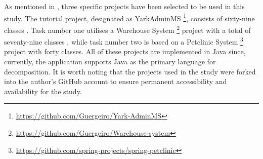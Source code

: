 As mentioned in , three specific projects have been
selected to be used in this study. The tutorial project, designated as
YarkAdminMS \footnote{\url{https://github.com/Guergeiro/Yark-AdminMS}},
consists of sixty-nine classes \cite{brito2021identification}. Task number one
utilises a Warehouse System
\footnote{\url{https://github.com/Guergeiro/Warehouse-system}} project with a
total of seventy-nine classes \cite{brito2021identification}, while task number
two is based on a Petclinic System
\footnote{\url{https://github.com/spring-projects/spring-petclinic}} project
with forty classes. All of these projects are implemented in Java since,
currently, the application supports Java as the primary language for
decomposition. It is worth noting that the projects used in the study were
forked into the author's GitHub account to ensure permanent accessibility and
availability for the study.
